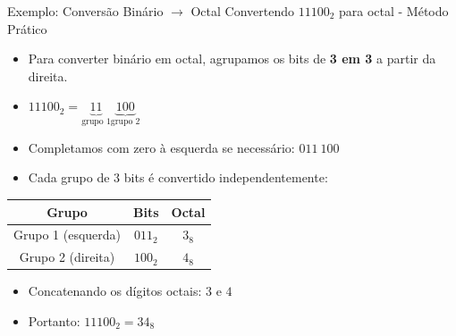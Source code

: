 \begin{frame}{Exemplo: Conversão Binário $\rightarrow$ Octal}
    Convertendo $11100_2$ para octal - Método Prático
    \begin{itemize}
        \item Para converter binário em octal, agrupamos os bits de \textbf{3 em 3} a partir da direita.
        \item $11100_2 = \underbrace{11}_{\text{grupo 1}} \underbrace{100}_{\text{grupo 2}}$
        \item Completamos com zero à esquerda se necessário: $011\ 100$
        \item Cada grupo de 3 bits é convertido independentemente:
    \end{itemize}

    \begin{table}[h]
        \centering
        \begin{tabular}{c|c|c}
            \textbf{Grupo}     & \textbf{Bits} & \textbf{Octal} \\
            \hline
            Grupo 1 (esquerda) & $011_2$       & $3_8$          \\
            Grupo 2 (direita)  & $100_2$       & $4_8$          \\
        \end{tabular}
    \end{table}

    \begin{itemize}
        \item Concatenando os dígitos octais: $3$ e $4$
        \item Portanto: $\boxed{11100_2 = 34_8}$
    \end{itemize}

\end{frame}

